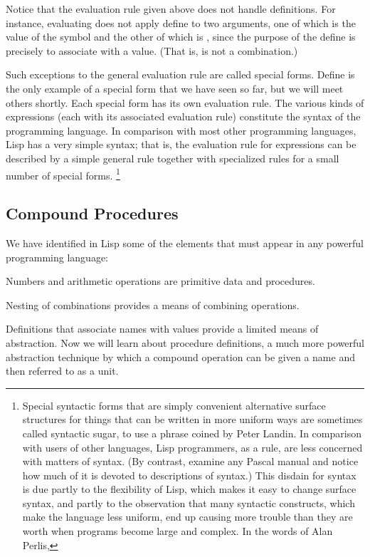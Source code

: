 Notice that the evaluation rule given above does not handle definitions.
For instance,
evaluating  does not apply define to two arguments,
one of which is the value of the symbol  and the other of which is ,
since the purpose of the define is precisely to associate  with a value.
(That is,  is not a combination.)

Such exceptions to the general evaluation rule are called special forms.
Define is the only example of a special form that we have seen so far,
but we will meet others shortly.
Each special form has its own evaluation rule.
The various kinds of expressions (each with its associated evaluation rule)
constitute the syntax of the programming language.
In comparison with most other programming languages,
Lisp has a very simple syntax;
that is,
the evaluation rule for expressions can be described
by a simple general rule together with specialized rules for a small number of special forms.
\footnote{%
   Special syntactic forms that are simply convenient alternative surface structures for things
   that can be written in more uniform ways are sometimes called syntactic sugar,
   to use a phrase coined by Peter Landin.
   In comparison with users of other languages,
   Lisp programmers, as a rule,
   are less concerned with matters of syntax.
   (By contrast, examine any Pascal manual and notice how much of it is devoted to descriptions of syntax.)
   This disdain for syntax is due partly to the flexibility of Lisp,
   which makes it easy to change surface syntax,
   and partly to the observation that many  syntactic constructs,
   which make the language less uniform,
   end up causing more trouble than they are worth when programs become large and complex.
   In the words of Alan Perlis, 
}

\subsection{Compound Procedures}

We have identified in Lisp some of the elements that must appear in any powerful programming language:
\startitemize[1]
\item Numbers and arithmetic operations are primitive data and procedures.
\item Nesting of combinations provides a means of combining operations.
\item Definitions that associate names with values provide a limited means of abstraction.
\stopitemize
Now we will learn about procedure definitions,
a much more powerful abstraction technique
by which a compound operation can be given a name and then referred to as a unit.

